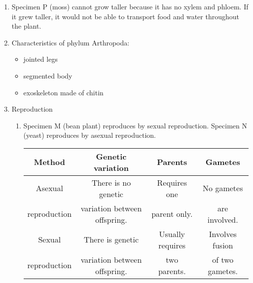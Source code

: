 \begin{enumerate}
\begin{itemize}
\end{itemize}

\item{Specimen P (moss) cannot grow taller because it has no xylem and phloem. If it grew taller, it would not be able to transport food and water throughout the plant.}
\item{Characteristics of phylum Arthropoda:}
\begin{itemize}
\item{jointed legs}
\item{segmented body}
\item{exoskeleton made of chitin}
\end{itemize}
\item{Reproduction}
\begin{enumerate}
\item{Specimen M (bean plant) reproduces by sexual reproduction. Specimen N (yeast) reproduces by asexual reproduction.}

\begin{center}
\begin{tabular}{ | c | c | c | c |}
\hline
Method & Genetic variation & Parents & Gametes \\ \hline
Asexual & There is no genetic & Requires one & No gametes  \\
reproduction & variation between offspring. & parent only. & are involved. \\ \hline
Sexual & There is genetic & Usually requires & Involves fusion  \\
reproduction & variation between offspring. & two parents. & of two gametes.\\ \hline
\hline
\end{tabular}
\end{center}

\end{enumerate}
\end{enumerate}

